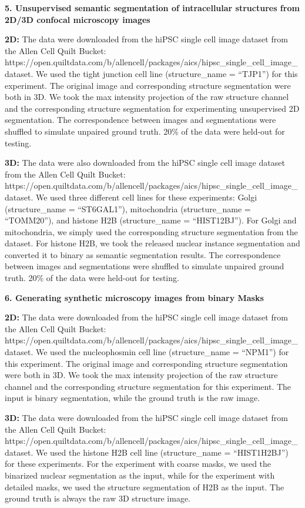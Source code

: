 \textbf{5. Unsupervised semantic segmentation of intracellular structures from 2D/3D confocal microscopy images}

\textbf{2D:} The data were downloaded from the hiPSC single cell image dataset from the Allen Cell Quilt Bucket: https://open.quiltdata.com/b/allencell/packages/aics/hipsc\_single\_cell\_image\_dataset. We used the tight junction cell line (structure\_name = ``TJP1'') for this experiment. The original image and corresponding structure segmentation were both in 3D. We took the max intensity projection of the raw structure channel and the corresponding structure segmentation for experimenting unsupervised 2D segmentation. The correspondence between images and segmentations were shuffled to simulate unpaired ground truth. 20\% of the data were held-out for testing.

\textbf{3D:} The data were also downloaded from the hiPSC single cell image dataset from the Allen Cell Quilt Bucket: https://open.quiltdata.com/b/allencell/packages/aics/hipsc\_single\_cell\_image\_dataset. We used three different cell lines for these experiments: Golgi (structure\_name = ``ST6GAL1''), mitochondria (structure\_name = ``TOMM20''), and histone H2B (structure\_name = ``HIST12BJ''). For Golgi and mitochondria, we simply used the corresponding structure segmentation from the dataset. For histone H2B, we took the released nuclear instance segmentation and converted it to binary as semantic segmentation results. The correspondence between images and segmentations were shuffled to simulate unpaired ground truth. 20\% of the data were held-out for testing.

\textbf{6. Generating synthetic microscopy images from binary Masks}

\textbf{2D:} The data were downloaded from the hiPSC single cell image dataset from the Allen Cell Quilt Bucket: https://open.quiltdata.com/b/allencell/packages/aics/hipsc\_single\_cell\_image\_dataset. We used the nucleophosmin cell line (structure\_name = ``NPM1'') for this experiment. The original image and corresponding structure segmentation were both in 3D. We took the max intensity projection of the raw structure channel and the corresponding structure segmentation for this experiment. The input is binary segmentation, while the ground truth is the raw image.

\textbf{3D:} The data were downloaded from the hiPSC single cell image dataset from the Allen Cell Quilt Bucket: https://open.quiltdata.com/b/allencell/packages/aics/hipsc\_single\_cell\_image\_dataset. We used the histone H2B cell line (structure\_name = ``HIST1H2BJ'') for these experiments. For the experiment with coarse masks, we used the binarized nuclear segmentation as the input, while for the experiment with detailed masks, we used the structure segmentation of H2B as the input. The ground truth is always the raw 3D structure image.


